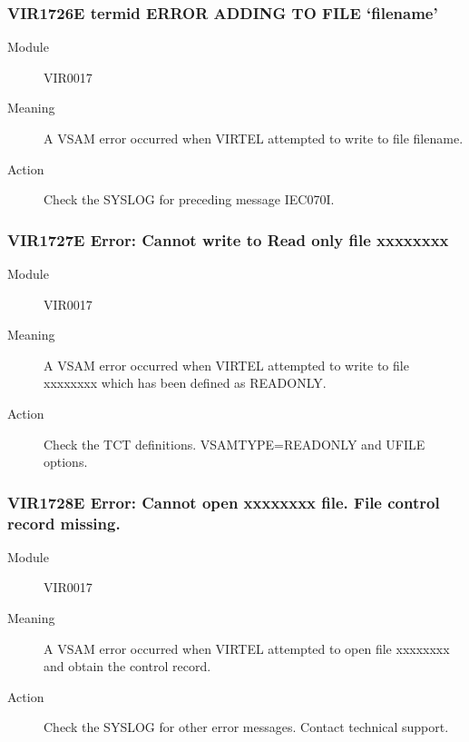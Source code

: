 \documentclass[letterpaper,10pt,english]{sphinxmanual}
\begin{document}
\subsubsection{VIR1726E termid ERROR ADDING TO FILE ‘filename’}
\label{\detokenize{messages:vir1726e-termid-error-adding-to-file-filename}}\begin{description}
\item[{Module}] \leavevmode
VIR0017

\item[{Meaning}] \leavevmode
A VSAM error occurred when VIRTEL attempted to write to file filename.

\item[{Action}] \leavevmode
Check the SYSLOG for preceding message IEC070I.

\end{description}


\subsubsection{VIR1727E Error: Cannot write to Read only file xxxxxxxx}
\label{\detokenize{messages:vir1727e-error-cannot-write-to-read-only-file-xxxxxxxx}}\begin{description}
\item[{Module}] \leavevmode
VIR0017

\item[{Meaning}] \leavevmode
A VSAM error occurred when VIRTEL attempted to write to file xxxxxxxx which has been defined as READONLY.

\item[{Action}] \leavevmode
Check the TCT definitions. VSAMTYPE=READONLY and UFILE options.

\end{description}


\subsubsection{VIR1728E Error: Cannot open xxxxxxxx file. File control record missing.}
\label{\detokenize{messages:vir1728e-error-cannot-open-xxxxxxxx-file-file-control-record-missing}}\begin{description}
\item[{Module}] \leavevmode
VIR0017

\item[{Meaning}] \leavevmode
A VSAM error occurred when VIRTEL attempted to open file xxxxxxxx and obtain the control record.

\item[{Action}] \leavevmode
Check the SYSLOG for other error messages. Contact technical support.

\end{description}
\end{document}
